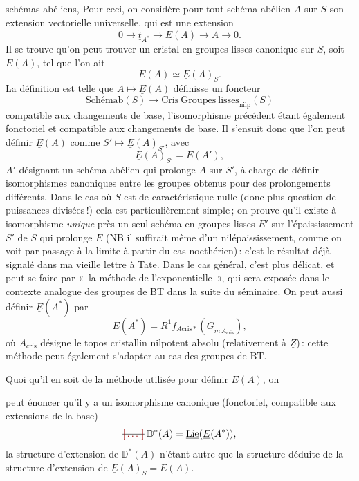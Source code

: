 \documentclass[11pt,a4paper]{article}
\begin{document}
schémas abéliens,  Pour ceci, on considère pour tout schéma abélien $A$ sur $S$ son extension vectorielle universelle, qui est une extension
\[
  0 \longrightarrow \underline{\check{t}}_{A^*} \longrightarrow E(A) \longrightarrow A \longrightarrow 0 .
\]
Il se trouve qu'on peut trouver un cristal en groupes lisses canonique sur $S$, soit $\underline{E}(A)$, tel que l'on ait
\[
  E(A) \simeq \underline{E}(A)_S .
\]
La définition est telle que  $A \mapsto \underline{E}(A)$ définisse un foncteur
\[
  \mathrm{Schémab}(S) \longrightarrow \mathrm{Cris\ Groupes\ lisses}_{\mathrm{nilp}}(S)
\]
compatible aux changements de base, l'isomorphisme précédent étant également fonctoriel et compatible aux changements de base. Il s'ensuit donc que l'on peut définir $\underline{E}(A)$ comme $S' \mapsto \underline{E}(A)_{S'}$, avec
\[
  \underline{E}(A)_{S'} = E(A') ,
\]
$A'$ désignant un schéma abélien qui prolonge $A$ sur $S'$, \struck{\ill{}} à charge de définir  isomorphismes canoniques entre les groupes obtenus pour des prolongements différents. Dans le cas où $S$ est de caractéristique nulle (donc plus question de puissances divisées\,!) cela est particulièrement simple\,; on prouve qu'il existe à isomorphisme \emph{unique} près un seul schéma en groupes lisses $E'$ sur l'épaississement $S'$ de $S$ qui prolonge $E$ (NB il suffirait même d'un nilépaississement, comme on voit par passage à la limite à partir du cas noethérien)\,: c'est le résultat déjà signalé dans ma vieille lettre à Tate. Dans le cas général, c'est plus délicat, et peut se faire par «~la méthode de l'exponentielle~», qui sera exposée dans le contexte analogue des groupes de BT dans la suite du séminaire. On peut aussi définir $\underline{E}(A^*)$ par
\[
  \underline{E}(A^*) = R^1 f_{A\mathrm{cris}*}(\underline{G}_{m\,A_{\mathrm{cris}}}) ,
\]
où $A_{\mathrm{cris}}$ désigne le topos cristallin  nilpotent absolu (relativement à $\underline{Z}$)\,: cette méthode peut également s'adapter au cas des groupes de BT.

Quoi qu'il en soit de la méthode utilisée pour définir $\underline{E}(A)$, on

peut énoncer qu'il y a un isomorphisme canonique (fonctoriel, compatible aux extensions de la base)
\[
  \text{\struck{\ill{}}}\; \mathbb{D}^*(A) = \underline{\mathrm{Lie}}(\underline{E}(A^*)) ,
\]
la structure d'extension \quad de $\mathbb{D}^*(A)$ n'étant autre que la structure  déduite de la structure d'extension \quad de $\underline{E}(A)_S = E(A)$.
\end{document}
